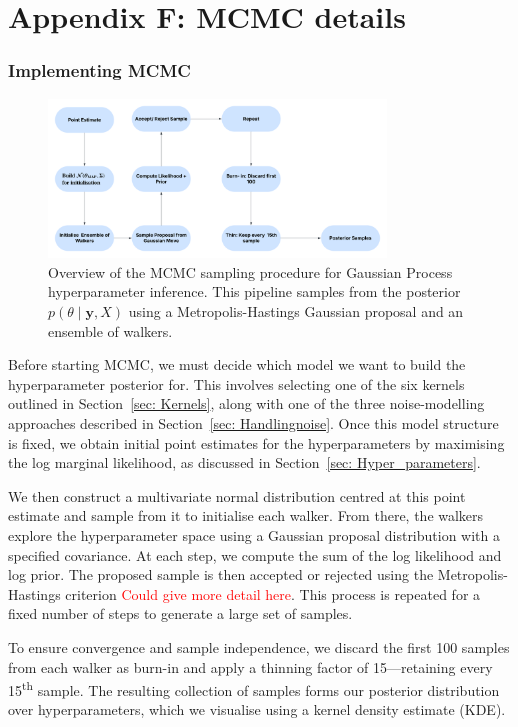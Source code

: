 \documentclass[10pt]{article}
\begin{document}
\section{Appendix F: MCMC details}
\subsubsection*{Implementing MCMC}
\begin{figure}[H]
    \centering
    \includegraphics[width=0.8\textwidth]{LatexPlots/MCMC_Flow.png}
    \caption{Overview of the MCMC sampling procedure for Gaussian Process hyperparameter inference.
     This pipeline samples from the posterior \( p(\theta \mid \mathbf{y}, X) \) using a Metropolis-Hastings Gaussian proposal and an ensemble of walkers.}
    \label{fig:MCMC flowchart}
\end{figure}

\noindent
Before starting MCMC, we must decide which model we want to build the hyperparameter posterior for. This involves selecting one of the six kernels outlined in Section~\ref{sec: Kernels}, along with one of the three noise-modelling approaches described in Section~\ref{sec: Handlingnoise}. Once this model structure is fixed, we obtain initial point estimates for the hyperparameters by maximising the log marginal likelihood, as discussed in Section~\ref{sec: Hyper_parameters}.

\noindent
We then construct a multivariate normal distribution centred at this point estimate and sample from it to initialise each walker. From there, the walkers explore the hyperparameter space using a Gaussian proposal distribution with a specified covariance. At each step, we compute the sum of the log likelihood and log prior. The proposed sample is then accepted or rejected using the Metropolis-Hastings criterion \textcolor{red}{Could give more detail here}. This process is repeated for a fixed number of steps to generate a large set of samples.

\noindent
To ensure convergence and sample independence, we discard the first 100 samples from each walker as burn-in and apply a thinning factor of 15—retaining every 15\textsuperscript{th} sample. The resulting collection of samples forms our posterior distribution over hyperparameters, which we visualise using a kernel density estimate (KDE).
\end{document}
